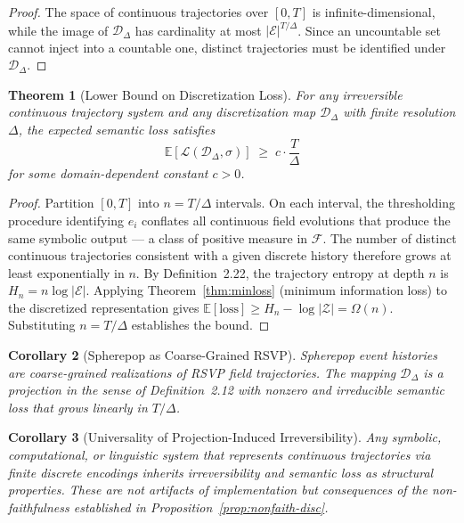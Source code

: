 \documentclass[12pt, twoside]{article}
\theoremstyle{plain}
\newtheorem{theorem}{Theorem}[section]
\newtheorem{corollary}[theorem]{Corollary}
\theoremstyle{definition}
\theoremstyle{remark}
\begin{document}
\begin{proof}
The space of continuous trajectories over $[0,T]$ is infinite-dimensional,
while the image of $\mathcal{D}_\Delta$ has cardinality at most
$|\mathcal{E}|^{T/\Delta}$.
Since an uncountable set cannot inject into a countable one,
distinct trajectories must be identified under $\mathcal{D}_\Delta$.
\end{proof}

\begin{theorem}[Lower Bound on Discretization Loss]
\label{thm:discloss}
For any irreversible continuous trajectory system and any discretization
map $\mathcal{D}_\Delta$ with finite resolution $\Delta$,
the expected semantic loss satisfies
\[
  \mathbb{E}[\mathcal{L}(\mathcal{D}_\Delta, \sigma)]
  \;\geq\; c \cdot \frac{T}{\Delta}
\]
for some domain-dependent constant $c > 0$.
\end{theorem}

\begin{proof}
Partition $[0,T]$ into $n = T/\Delta$ intervals.
On each interval, the thresholding procedure identifying $e_i$
conflates all continuous field evolutions that produce the same
symbolic output — a class of positive measure in $\mathcal{F}$.
The number of distinct continuous trajectories consistent with
a given discrete history therefore grows at least exponentially
in $n$.
By Definition~2.22, the trajectory entropy at depth $n$ is
$H_n = n \log |\mathcal{E}|$.
Applying Theorem~\ref{thm:minloss} (minimum information loss)
to the discretized representation gives
$\mathbb{E}[\mathrm{loss}] \geq H_n - \log|\mathcal{Z}| = \Omega(n)$.
Substituting $n = T/\Delta$ establishes the bound.
\end{proof}

\begin{corollary}[Spherepop as Coarse-Grained RSVP]
\label{cor:coarse}
Spherepop event histories are coarse-grained realizations of RSVP
field trajectories.
The mapping $\mathcal{D}_\Delta$ is a projection in the sense of
Definition~2.12 with nonzero and irreducible semantic loss that
grows linearly in $T/\Delta$.
\end{corollary}

\begin{corollary}[Universality of Projection-Induced Irreversibility]
\label{cor:universality}
Any symbolic, computational, or linguistic system that represents
continuous trajectories via finite discrete encodings inherits
irreversibility and semantic loss as structural properties.
These are not artifacts of implementation but consequences of
the non-faithfulness established in Proposition~\ref{prop:nonfaith-disc}.
\end{corollary}
\end{document}
